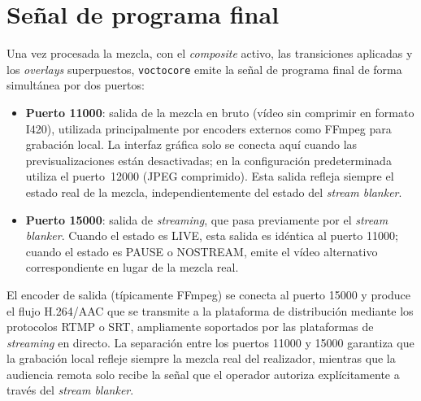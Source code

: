 \section{Señal de programa final}
\label{sec:senal_programa}

Una vez procesada la mezcla, con el \textit{composite} activo, las transiciones aplicadas y
los \textit{overlays} superpuestos, \texttt{voctocore} emite la señal de programa final de forma
simultánea por dos puertos:

\begin{itemize}
  \item \textbf{Puerto 11000}: salida de la mezcla en bruto (vídeo sin comprimir en
        formato I420), utilizada principalmente por encoders externos como FFmpeg para
        grabación local. La interfaz gráfica solo se conecta aquí cuando las
        previsualizaciones están desactivadas; en la configuración predeterminada
        utiliza el puerto~12000 (JPEG comprimido). Esta salida refleja siempre el
        estado real de la mezcla, independientemente del estado del \textit{stream blanker}.
  \item \textbf{Puerto 15000}: salida de \textit{streaming}, que pasa previamente por el
        \textit{stream blanker}. Cuando el estado es LIVE, esta salida es idéntica al puerto
        11000; cuando el estado es PAUSE o NOSTREAM, emite el vídeo alternativo
        correspondiente en lugar de la mezcla real.
\end{itemize}

El encoder de salida (típicamente FFmpeg) se conecta al puerto 15000 y produce el
flujo H.264/\acs{AAC} que se transmite a la plataforma de distribución mediante los protocolos
\acs{RTMP} o \acs{SRT}, ampliamente soportados por las plataformas de \textit{streaming} en directo. La separación entre los puertos 11000 y
15000 garantiza que la grabación local refleje siempre la mezcla real del realizador,
mientras que la audiencia remota solo recibe la señal que el operador autoriza
explícitamente a través del \textit{stream blanker}.
